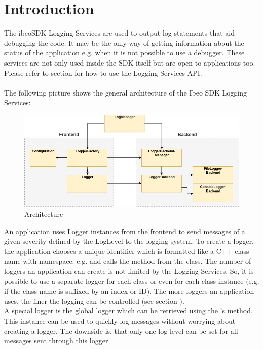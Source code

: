 \section{Introduction}

The ibeoSDK Logging Services are used to output log statements that aid debugging the code. It may be the only way of getting information about the status of the application e.g. when it is not possible to use a debugger. These services are not only used inside the SDK itself but are open to applications too. Please refer to section  for how to use the Logging Services API.\\
\\
The following picture shows the general architecture of the Ibeo SDK Logging Services:

\begin{figure}[h]
	\centering
	\includegraphics[scale=0.5]{images/logging_architecture.png}
	\caption{Architecture}
\end{figure}

An application uses Logger instances from the frontend to send messages of a given severity defined by the LogLevel to the logging system. To create a logger, the application chooses a unique identifier which is formatted like a C++ class name with namespace: e.g.  and calls the  method from the  class. The number of loggers an application can create is not limited by the Logging Services. So, it is possible to use a separate logger for each class or even for each class instance (e.g. if the class name is suffixed by an index or ID). The more loggers an application uses, the finer the logging can be controlled (see section ).\\
A special logger is the global logger which can be retrieved using the 's  method. This instance can be used to quickly log messages without worrying about creating a logger. The downside is, that only one log level can be set for all messages sent through this logger.\\

